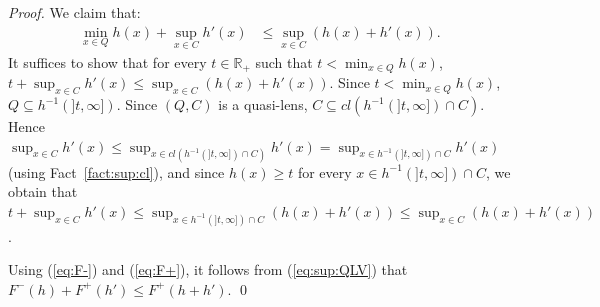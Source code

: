 \documentclass[preprint,12pt]{elsarticle}
\newcommand{\Rp}{\mathbb{R}_+}
\begin{document}
\begin{proof}
  We claim that:
  \begin{align}
    \label{eq:sup:QLV}
    \min_{x \in Q} h (x) + \sup_{x \in C} h' (x)
    & \leq \sup_{x \in C} (h (x) + h' (x)).
  \end{align}
  It suffices to show that for every $t \in \Rp$ such that
  $t < \min_{x \in Q} h (x)$,
  $t + \sup_{x \in C} h' (x) \leq \sup_{x \in C} (h (x) + h' (x))$.
  Since $t < \min_{x \in Q} h (x)$,
  $Q \subseteq h^{-1} (]t, \infty])$.  Since $(Q, C)$ is a quasi-lens,
  $C \subseteq cl (h^{-1} (]t, \infty]) \cap C)$.  Hence
  $\sup_{x \in C} h' (x) \leq \sup_{x \in cl (h^{-1} (]t, \infty])
    \cap C)} h' (x) = \sup_{x \in h^{-1} (]t, \infty]) \cap C} h' (x)$
  (using Fact~\ref{fact:sup:cl}), and since $h (x) \geq t$ for every
  $x \in h^{-1} (]t, \infty]) \cap C$, we obtain that
  $t + \sup_{x \in C} h' (x) \leq \sup_{x \in h^{-1} (]t, \infty])
    \cap C} (h (x) + h' (x)) \leq \sup_{x \in C} (h (x) + h' (x))$.

  Using (\ref{eq:F-}) and (\ref{eq:F+}), it follows from
  (\ref{eq:sup:QLV}) that $F^- (h) + F^+ (h') \leq F^+ (h+h')$.  \qed
\end{proof}
\end{document}
